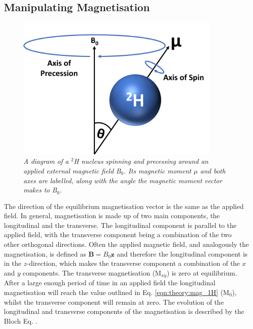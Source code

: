 \subsection{Manipulating Magnetisation}

\begin{figure}
    \centering
    \includegraphics[width=0.9\textwidth]{Figures/Theory/Moment.png}
    \caption{\textit{A diagram of a $^2$H nucleus spinning and precessing around an applied external magnetic field B$_0$. Its magnetic moment $\mu$ and both axes are labelled, along with the angle the magnetic moment vector makes to B$_0$.}}
    \label{fig:theory:moment}
\end{figure}

The direction of the equilibrium magnetisation vector is the same as the applied field. In general, magnetisation is made up of two main components, the longitudinal and the transverse. The longitudinal component is parallel to the applied field, with the transverse component being a combination of the two other orthogonal directions. Often the applied magnetic field, and analogously the magnetisation, is defined as $\mathbf{B}=B_0\mathbf{z}$ and therefore the longitudinal component is in the $z$-direction, which makes the transverse component a combination of the $x$ and $y$ components. The transverse magnetisation (M$_{xy}$) is zero at equilibrium. After a large enough period of time in an applied field the longitudinal magnetisation will reach the value outlined in Eq. \ref{eqn:theory:mag_1H} (M$_0$), whilst the transverse component will remain at zero. The evolution of the longitudinal and transverse components of the magnetisation is described by the Bloch Eq. \cite{Bloch1946NuclearInduction}.

